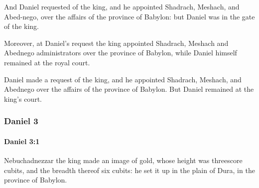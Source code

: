 			\begin{versebox}
					\item[BHS] 
					\item[LXX] 
					\item[ASV] And Daniel requested of the king, and he appointed Shadrach, Meshach, and Abed-nego, over the affairs of the province of Babylon: but Daniel was in the gate of the king.
					\item[NIV] Moreover, at Daniel’s request the king appointed Shadrach, Meshach and Abednego administrators over the province of Babylon, while Daniel himself remained at the royal court.
					\item[NRSV] Daniel made a request of the king, and he appointed Shadrach, Meshach, and Abednego over the affairs of the province of Babylon. But Daniel remained at the king’s court.
			\end{versebox}
	\subsubsection{Daniel 3} %
		\label{DANIEL-3}

		\paragraph{Daniel 3:1} %
			\label{DANIEL-3-1}

			Nebuchadnezzar the king made an image of gold, whose height was threescore cubits, and the breadth thereof six cubits: he set it up in the plain of Dura, in the province of Babylon.

